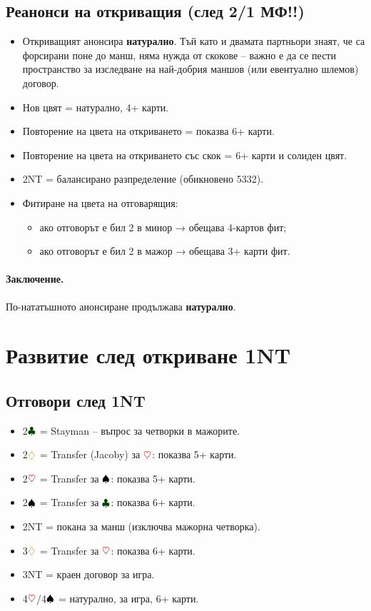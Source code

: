 \documentclass[10pt,a5paper]{extarticle}
\newcommand{\Rheart}{\textcolor{red}{\heartsuit}}
\newcommand{\Rdiamond}{\textcolor{orange}{\diamondsuit}}
\newcommand{\Bspade}{\textcolor{black}{\spadesuit}}
\newcommand{\Bclub}{\textcolor{darkgreen}{\clubsuit}}
\begin{document}
\subsection*{Реанонси на откриващия (след 2/1 МФ!!)}
\begin{itemize}
  \item[] Откриващият анонсира \textbf{натурално}.  
  Тъй като и двамата партньори знаят, че са форсирани поне до манш, няма нужда от скокове – важно е да се пести пространство за изследване на най-добрия маншов (или евентуално шлемов) договор.
  \item[] Нов цвят = натурално, 4+ карти.
  \item[] Повторение на цвета на откриването = показва 6+ карти.
  \item[] Повторение на цвета на откриването със скок = 6+ карти и солиден цвят.
  \item[] 2NT = балансирано разпределение (обикновено 5332).
  \item[] Фитиране на цвета на отговарящия:
  \begin{itemize}
    \item[] ако отговорът е бил 2 в минор → обещава 4-картов фит;
    \item[] ако отговорът е бил 2 в мажор → обещава 3+ карти фит.
  \end{itemize}
\end{itemize}

\paragraph{Заключение.}  
По-нататъшното анонсиране продължава \textbf{натурално}.
\newpage
\section{Развитие след откриване 1NT}

\subsection*{Отговори след 1NT}
\begin{itemize}
  \item[] 2$\Bclub$ = Stayman – въпрос за четворки в мажорите.
  \item[] 2$\Rdiamond$ = Transfer (Jacoby) за $\Rheart$: показва 5+ карти.
  \item[] 2$\Rheart$ = Transfer за $\Bspade$: показва 5+ карти.
  \item[] 2$\Bspade$ = Transfer за $\Bclub$: показва 6+ карти.
  \item[] 2NT = покана за манш (изключва мажорна четворка).
  \item[] 3$\Rdiamond$ = Transfer за $\Rheart$: показва 6+ карти.
  \item[] 3NT = краен договор за игра.
  \item[] 4$\Rheart$/4$\Bspade$ = натурално, за игра, 6+ карти.
\end{itemize}
\end{document}
